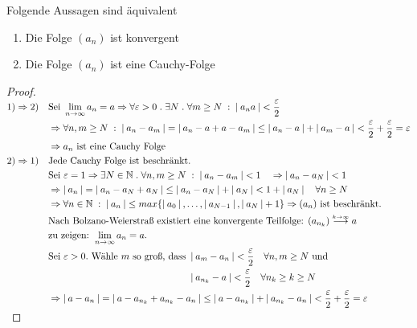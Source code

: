 \documentclass[a4paper,titlepage,oneside]{article}
\def\N{\ensuremath{\mathbb{N}} }
\renewcommand{\epsilon}{\ensuremath{\varepsilon} }
\def\zz{\text{zu zeigen: }}
\def\sp{\hspace{0,1cm}}
\def\spdot{\sp.\sp}
\def\spcolon{\sp:\sp}
\renewcommand{\liminf}[2][n]{\ensuremath{\lim\limits_{#1 \rightarrow \infty}{#2}}}
\newcommand{\abs}[1]{\ensuremath{\left|\:#1\:\right|}}
\newcommand{\longtoinf}[1][n]{\ensuremath{\overset{\scriptscriptstyle{#1 \to \infty}}{\longrightarrow}}}
\theoremstyle{thmstyle}
\begin{document}
\begin{subsatz}
Folgende Aussagen sind äquivalent
\begin{enumerate}
\item Die Folge \((a_n)\) ist konvergent
\item Die Folge \((a_n)\) ist eine Cauchy-Folge
\end{enumerate}
\begin{proof}
\begin{math} \displaystyle
\begin{aligned}[t]
1) \Rightarrow 2) \quad &\text{Sei }\liminf{a_n} = a \Rightarrow \forall \epsilon > 0 \spdot \exists N \spdot \forall m \ge N \spcolon \abs{a_n a} < \frac{\epsilon}{2} \\
&\Rightarrow \forall n, m \ge N \spcolon \abs{a_n - a_m} = \abs{a_n - a + a - a_m} \le \abs{a_n - a }  + \abs{a_m - a} <  \frac{\epsilon}{2}+ \frac{\epsilon}{2} = \epsilon \\
&\Rightarrow a_n \text{ ist eine Cauchy Folge}\\
2) \Rightarrow 1) \quad &\text{Jede Cauchy Folge ist beschränkt.} \\
& \text{Sei } \epsilon = 1 \Rightarrow \exists N \in \N \spdot \forall n, m \ge N \spcolon \abs{a_n - a_m} < 1 \quad \Rightarrow \abs{a_n - a_N} < 1 \\
&\Rightarrow \abs{a_n} = \abs{a_n - a_N + a_N} \le \abs{a_n - a_N} + \abs{a_N} < 1 + \abs{a_N} \quad \forall n  \ge N\\
&\Rightarrow \forall n \in \N \spcolon \abs{a_n} \le max\{\abs{a_0},\dots,\abs{a_{N-1}},\abs{a_N} + 1\} \Rightarrow (a_n) \text{ ist beschränkt.}\\
&\text{Nach Bolzano-Weierstraß existiert eine konvergente Teilfolge: } (a_{n_k}) \longtoinf[k] a\\
&\zz \liminf{a_n} = a.\\
&\text{Sei }\epsilon > 0. \text{ Wähle $m$ so groß, dass }\begin{aligned}[t]&\abs{a_m - a_n} < \frac{\epsilon}{2} \quad \forall n,m \ge N \text{ und } \\
&\abs{a_{n_k} - a} < \frac{\epsilon}{2} \quad \forall n_k \ge k \ge N \end{aligned} \\
&\Rightarrow \abs{a-a_n} = \abs{a - a_{n_k} + a_{n_k} - a_n} \le \abs{a- a_{n_k}} + \abs{a_{n_k} - a_n} < \frac{\epsilon}{2} + \frac{\epsilon}{2} = \epsilon
\end{aligned}\\
\end{math}
\end{proof}
\end{subsatz}
\end{document}
